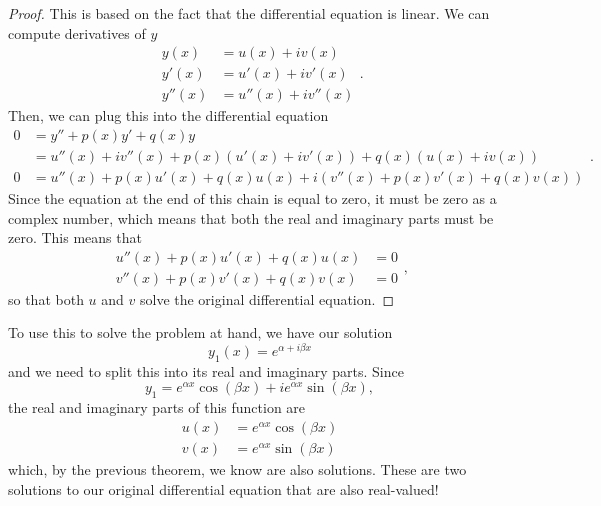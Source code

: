 \begin{proof}
This is based on the fact that the differential equation is linear. We can compute derivatives of $y$
\begin{equation*}
\begin{split}
y(x)&= u(x) + iv(x) \\
y'(x) &= u'(x) + iv'(x) \\
y''(x) &= u''(x) + iv''(x)
\end{split}.
\end{equation*}
Then, we can plug this into the differential equation
\begin{equation*}
\begin{split}
0 &= y'' + p(x)y' + q(x) y \\
&= u''(x) + iv''(x) + p(x)(u'(x) + iv'(x)) + q(x) (u(x) + iv(x)) \\
0&= u''(x) + p(x)u'(x) + q(x)u(x) + i(v''(x) + p(x)v'(x) + q(x)v(x)) 
\end{split}.
\end{equation*}
Since the equation at the end of this chain is equal to zero, it must be zero as a complex number, which means that both the real and imaginary parts must be zero. This means that
\begin{equation*}
\begin{split}
u''(x) + p(x)u'(x) + q(x)u(x) &= 0 \\
v''(x) + p(x)v'(x) + q(x)v(x) &= 0
\end{split},
\end{equation*}
so that both $u$ and $v$ solve the original differential equation.
\end{proof}

To use this to solve the problem at hand, we have our solution
\begin{equation*}
y_1(x) = e^{\alpha + i\beta x}
\end{equation*}
and we need to split this into its real and imaginary parts. Since
\begin{equation*}
y_1  = e^{\alpha x} \cos (\beta x) + i e^{\alpha x} \sin (\beta x),
\end{equation*}
the real and imaginary parts of this function are
\begin{equation*}
\begin{split}
u(x) &= e^{\alpha x} \cos (\beta x) \\
v(x) &= e^{\alpha x} \sin (\beta x)
\end{split}
\end{equation*}
which, by the previous theorem, we know are also solutions. These are two solutions to our original differential equation that are also real-valued!

